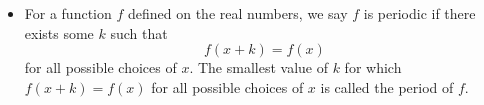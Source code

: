 \documentclass[nooutcomes]{ximera}
\begin{document}
%
%
%
%
%
%
%
%
%

\begin{summary}\begin{itemize}
\item For a function $f$ defined on the real numbers, we say $f$ is periodic if there exists some $k$ such that
\begin{equation*}
f(x + k) = f(x)
\end{equation*}
for all possible choices of $x$. The smallest value of $k$ for which $f(x + k) = f(x)$ for all possible choices of $x$ is called the period of $f$.
\end{itemize}\end{summary}
\end{document}
